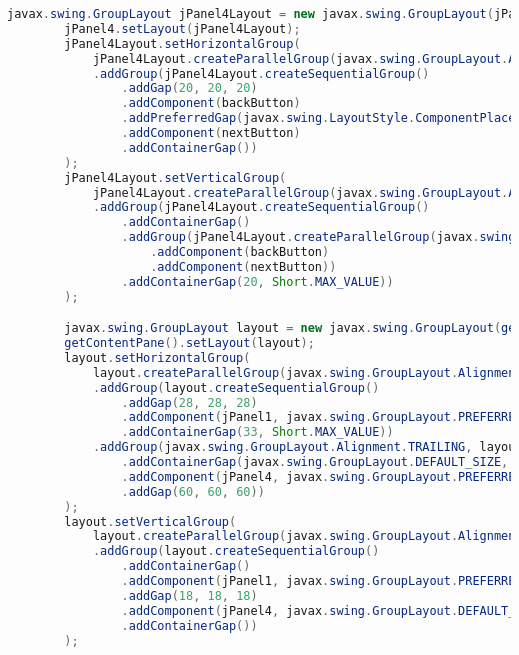 \begin{lstlisting}[language=Java, caption=TampilanKondisiKetetanggaan.java]
        javax.swing.GroupLayout jPanel4Layout = new javax.swing.GroupLayout(jPanel4);
        jPanel4.setLayout(jPanel4Layout);
        jPanel4Layout.setHorizontalGroup(
            jPanel4Layout.createParallelGroup(javax.swing.GroupLayout.Alignment.LEADING)
            .addGroup(jPanel4Layout.createSequentialGroup()
                .addGap(20, 20, 20)
                .addComponent(backButton)
                .addPreferredGap(javax.swing.LayoutStyle.ComponentPlacement.RELATED, 212, Short.MAX_VALUE)
                .addComponent(nextButton)
                .addContainerGap())
        );
        jPanel4Layout.setVerticalGroup(
            jPanel4Layout.createParallelGroup(javax.swing.GroupLayout.Alignment.LEADING)
            .addGroup(jPanel4Layout.createSequentialGroup()
                .addContainerGap()
                .addGroup(jPanel4Layout.createParallelGroup(javax.swing.GroupLayout.Alignment.BASELINE)
                    .addComponent(backButton)
                    .addComponent(nextButton))
                .addContainerGap(20, Short.MAX_VALUE))
        );

        javax.swing.GroupLayout layout = new javax.swing.GroupLayout(getContentPane());
        getContentPane().setLayout(layout);
        layout.setHorizontalGroup(
            layout.createParallelGroup(javax.swing.GroupLayout.Alignment.LEADING)
            .addGroup(layout.createSequentialGroup()
                .addGap(28, 28, 28)
                .addComponent(jPanel1, javax.swing.GroupLayout.PREFERRED_SIZE, 419, javax.swing.GroupLayout.PREFERRED_SIZE)
                .addContainerGap(33, Short.MAX_VALUE))
            .addGroup(javax.swing.GroupLayout.Alignment.TRAILING, layout.createSequentialGroup()
                .addContainerGap(javax.swing.GroupLayout.DEFAULT_SIZE, Short.MAX_VALUE)
                .addComponent(jPanel4, javax.swing.GroupLayout.PREFERRED_SIZE, javax.swing.GroupLayout.DEFAULT_SIZE, javax.swing.GroupLayout.PREFERRED_SIZE)
                .addGap(60, 60, 60))
        );
        layout.setVerticalGroup(
            layout.createParallelGroup(javax.swing.GroupLayout.Alignment.LEADING)
            .addGroup(layout.createSequentialGroup()
                .addContainerGap()
                .addComponent(jPanel1, javax.swing.GroupLayout.PREFERRED_SIZE, 461, javax.swing.GroupLayout.PREFERRED_SIZE)
                .addGap(18, 18, 18)
                .addComponent(jPanel4, javax.swing.GroupLayout.DEFAULT_SIZE, javax.swing.GroupLayout.DEFAULT_SIZE, Short.MAX_VALUE)
                .addContainerGap())
        );


\end{lstlisting}
